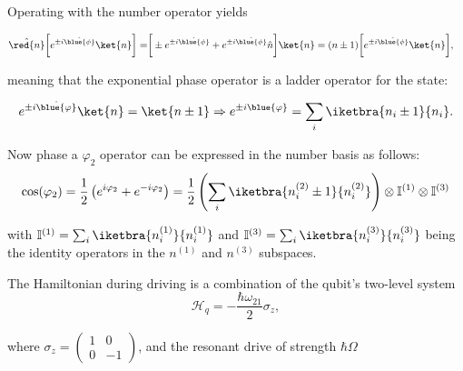 \begin{thebibliography}{99}
  \vspace{-1em}

  Operating with the number operator yields
  
  {\scriptsize \begin{equation}\label{eq:ab2}
      \begin{aligned}
        \hat{\red{n}}\bigg[e^{\pm   i\hat{\blue{\phi}}}\ket{n}\bigg]   =   &   \bigg[\pm   e^{\pm
          i\hat{\blue{\phi}}}    +    e^{\pm   i\hat{\blue{\phi}}}\hat{n}\bigg]\ket{n}    =    (n\pm
        1)\bigg[e^{\pm i\hat{\blue{\phi}}}\ket{n}\bigg],
      \end{aligned}
    \end{equation}}

  meaning that the exponential phase operator is a ladder operator for the  state:

  \begin{equation}
    \label{eq:ab5}
    e^{\pm i\hat{\blue{\varphi}}}\ket{n} = \ket{n \pm 1} \Rightarrow e^{\pm i\blue{\varphi}} = \sum_{{i}} \iketbra{n_{i}\pm1}{n_i}.
  \end{equation}

  \vspace{-0.2em}
  
  \noindent Now  phase a $\varphi_{2}$  operator can  be expressed in  the number basis  as follows:
  {\scriptsize
    \begin{equation}
      \label{eq:ab4}
      \cos(\varphi_{2}) = \frac{1}{2}\left(e^{i\varphi_{2}}+e^{-i\varphi_2}\right) = \frac{1}{2}\left(\sum_{{i}}\iketbra{n_{i}^{(2)}\pm 1}{n_{i}^{(2)}} \right)\otimes\mathbb{I}^{(1)}\otimes\mathbb{I}^{(3)}
    \end{equation}}

  \noindent    with   $    \mathbb{I}^{(1)}=\sum_{i}\iketbra{n_{i}^{(1)}}{n_{i}^{(1)}}   $    and
  $ \mathbb{I}^{(3)}=\sum_{i}\iketbra{n_{i}^{(3)}}{n_{i}^{(3)}} $ being the identity operators in
  the $ n^{(1)} $ and $ n^{(3)}$ subspaces.

 The Hamiltonian during driving is a combination of the qubit's two-level system
  \begin{equation}
    \label{eq:rabi1}
    \mathcal{H}_{q} = -\frac{\hbar\omega_{21}}{2}\sigma_{z},
  \end{equation}

  \noindent                                                                              where
  $\sigma_z = \ensuremath{\left(\begin{smallmatrix} 1 &  0\\0 & -1 \end{smallmatrix}\right)} $, and
  the resonant drive of strength $ \hbar\Omega $


\end{thebibliography}
